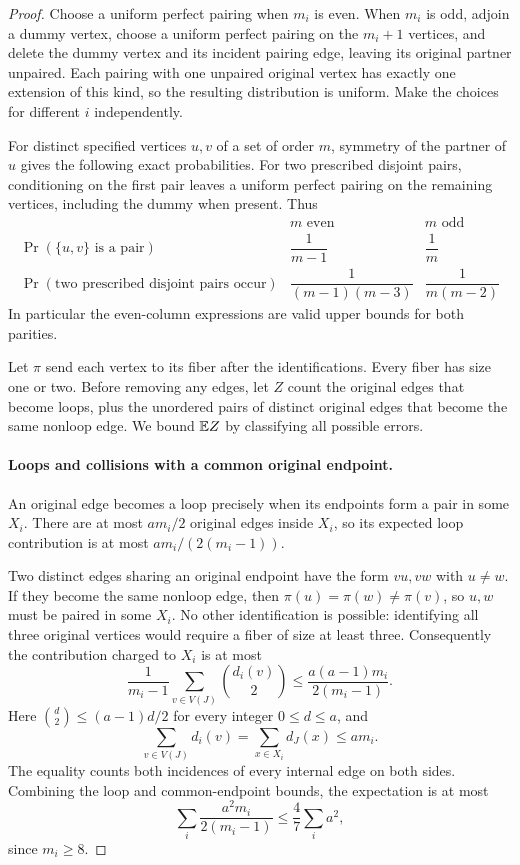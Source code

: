 \begin{proof}
Choose a uniform perfect pairing when $m_i$ is even.  When $m_i$ is odd,
adjoin a dummy vertex, choose a uniform perfect pairing on the $m_i+1$
vertices, and delete the dummy vertex and its incident pairing edge,
leaving its original partner unpaired.  Each pairing with
one unpaired original vertex has exactly one extension of this kind, so
the resulting distribution is uniform.  Make the choices for different
$i$ independently.

For distinct specified vertices $u,v$ of a set of order $m$, symmetry of
the partner of $u$ gives the following exact probabilities.  For two
prescribed disjoint pairs, conditioning on the first pair leaves a uniform
perfect pairing on the remaining vertices, including the dummy when
present.  Thus
\begin{equation}\label{eq:fold-probabilities}
\begin{array}{c|cc}
 &m\text{ even}&m\text{ odd}\\ \hline
 \Pr(\{u,v\}\text{ is a pair})
     &\dfrac1{m-1}&\dfrac1m\\[6pt]
 \Pr(\text{two prescribed disjoint pairs occur})
     &\dfrac1{(m-1)(m-3)}&\dfrac1{m(m-2)}
\end{array}
\end{equation}
In particular the even-column expressions are valid upper bounds for
both parities.

Let $\pi$ send each vertex to its fiber after the identifications.  Every
fiber has size one or two.  Before removing any edges, let $Z$ count the
original edges that become loops, plus the unordered pairs of distinct
original edges that become the same nonloop edge.  We bound $\mathbb E Z$ by
classifying all possible errors.

\paragraph{Loops and collisions with a common original endpoint.}
An original edge becomes a loop precisely when its endpoints form a pair
in some $X_i$.  There are at most $a m_i/2$ original edges inside $X_i$,
so its expected loop contribution is at most $a m_i/(2(m_i-1))$.

Two distinct edges sharing an original endpoint have the form $vu,vw$
with $u\ne w$.  If they become the same nonloop edge, then
$\pi(u)=\pi(w)\ne\pi(v)$, so $u,w$ must be paired in some $X_i$.
No other identification is possible: identifying all three original
vertices would require a fiber of size at least three.  Consequently the
contribution charged to $X_i$ is at most
\[
 \frac1{m_i-1}\sum_{v\in V(J)}\binom{d_i(v)}2
 \le \frac{a(a-1)m_i}{2(m_i-1)}.
\]
Here $\binom d2\le(a-1)d/2$ for every integer $0\le d\le a$, and
\[
 \sum_{v\in V(J)}d_i(v)=\sum_{x\in X_i}d_J(x)\le a m_i.
\]
The equality counts both incidences of every internal edge on both sides.
Combining the loop and common-endpoint bounds, the expectation is at most
\begin{equation}\label{eq:fold-first-errors}
 \sum_i\frac{a^2m_i}{2(m_i-1)}
 \le\frac47\sum_i a^2,
\end{equation}
since $m_i\ge8$.


\end{proof}
